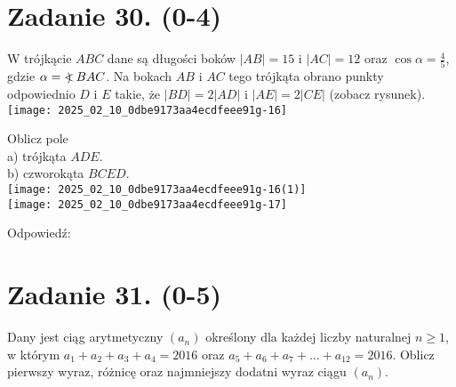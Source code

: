 \documentclass[10pt]{article}
\newcommand\Varangle{\mathop{{<\!\!\!\!\!\text{\small)}}\:}\nolimits}
\begin{document}
\section*{Zadanie 30. (0-4)}
W trójkącie \(A B C\) dane są długości boków \(|A B|=15\) i \(|A C|=12\) oraz \(\cos \alpha=\frac{4}{5}\), gdzie \(\alpha=\Varangle B A C\). Na bokach \(A B\) i \(A C\) tego trójkąta obrano punkty odpowiednio \(D\) i \(E\) takie, że \(|B D|=2|A D|\) i \(|A E|=2|C E|\) (zobacz rysunek).\\
\texttt{[image: 2025\_02\_10\_0dbe9173aa4ecdfeee91g-16]}

Oblicz pole\\
a) trójkąta \(A D E\).\\
b) czworokąta \(B C E D\).\\
\texttt{[image: 2025\_02\_10\_0dbe9173aa4ecdfeee91g-16(1)]}\\
\texttt{[image: 2025\_02\_10\_0dbe9173aa4ecdfeee91g-17]}

Odpowiedź:

\section*{Zadanie 31. (0-5)}
Dany jest ciąg arytmetyczny \(\left(a_{n}\right)\) określony dla każdej liczby naturalnej \(n \geq 1\), w którym \(a_{1}+a_{2}+a_{3}+a_{4}=2016\) oraz \(a_{5}+a_{6}+a_{7}+\ldots+a_{12}=2016\). Oblicz pierwszy wyraz, różnicę oraz najmniejszy dodatni wyraz ciągu \(\left(a_{n}\right)\).
\end{document}
